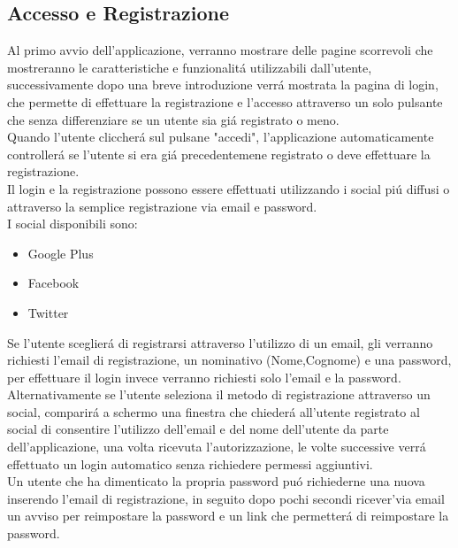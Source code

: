 \subsection{Accesso e Registrazione}
Al primo avvio dell'applicazione, verranno mostrare delle pagine scorrevoli che mostreranno le caratteristiche e funzionalit\'a utilizzabili dall'utente, successivamente dopo una breve introduzione verr\'a mostrata la pagina di login, che permette di effettuare la registrazione e l'accesso attraverso un solo pulsante che senza differenziare se un utente sia gi\'a registrato o meno.\\
Quando l'utente cliccher\'a sul pulsane "accedi", l'applicazione automaticamente controller\'a se l'utente si era gi\'a precedentemene registrato o deve effettuare la registrazione.\\
Il login e la registrazione possono essere effettuati utilizzando i social pi\'u diffusi o attraverso la semplice registrazione via email e password.\\
I social disponibili sono:
\begin{itemize}
  \item Google Plus
  \item Facebook
  \item Twitter
\end{itemize}
Se l'utente sceglier\'a di registrarsi attraverso l'utilizzo di un email, gli verranno richiesti l'email di registrazione, un nominativo (Nome,Cognome) e una password, per effettuare il login invece verranno richiesti solo l'email e la password.\\
Alternativamente se l'utente seleziona il metodo di registrazione attraverso un social, comparir\'a a schermo una finestra che chieder\'a all'utente registrato al social di consentire l'utilizzo dell'email e del nome dell'utente da parte dell'applicazione, una volta ricevuta l'autorizzazione, le volte successive verr\'a effettuato un login automatico senza richiedere permessi aggiuntivi.\\
Un utente che ha dimenticato la propria password pu\'o richiederne una nuova inserendo l'email di registrazione, in seguito dopo pochi secondi ricever'\a via email un avviso per reimpostare la password e un link che permetter\'a di reimpostare la password.\\



